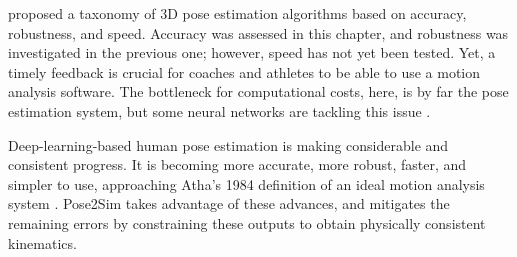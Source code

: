 \cite{Desmarais2021} proposed a taxonomy of 3D pose estimation algorithms based on accuracy, robustness, and speed. Accuracy was assessed in this chapter, and robustness was investigated in the previous one; however, speed has not yet been tested. Yet, a timely feedback is crucial for coaches and athletes to be able to use a motion analysis software. The bottleneck for computational costs, here, is by far the pose estimation system, but some neural networks are tackling this issue \cite{Bazarevsky2020, Wang2022a}.

Deep-learning-based human pose estimation is making considerable and consistent progress. It is becoming more accurate, more robust, faster, and simpler to use, approaching Atha’s 1984 definition of an ideal motion analysis system \cite{Atha1984}. Pose2Sim takes advantage of these advances, and mitigates the remaining errors by constraining these outputs to obtain physically consistent kinematics.